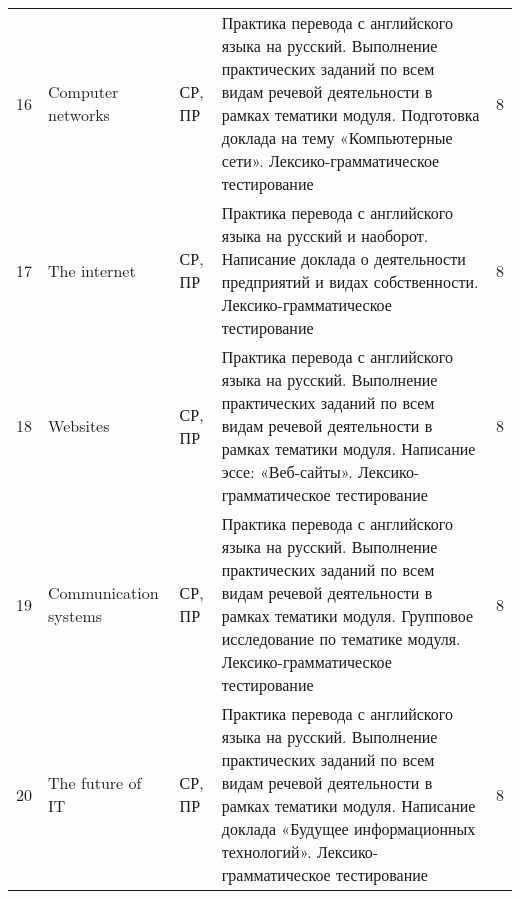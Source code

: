 \begin{center}
\begin{longtable}{p{} p{} p{} p{} p{}}
16 & Computer networks & СР, ПР & Практика перевода с английского языка на русский. Выполнение практических заданий по всем видам речевой деятельности в рамках тематики модуля. 
Подготовка доклада на тему «Компьютерные сети».  Лексико-грамматическое тестирование& 8 \\
17 & The internet & СР, ПР & Практика перевода с английского языка на русский и наоборот. Написание доклада о деятельности предприятий и видах собственности. Лексико-грамматическое тестирование & 8 \\
18 & Websites & СР, ПР & Практика перевода с английского языка на русский. Выполнение практических заданий по всем видам речевой деятельности в рамках тематики модуля. Написание эссе: «Веб-сайты». Лексико-грамматическое тестирование & 8 \\
19 & Communication systems & СР, ПР & Практика перевода с английского языка на русский. Выполнение практических заданий по всем видам речевой деятельности в рамках тематики модуля. Групповое исследование по тематике модуля. Лексико-грамматическое тестирование & 8 \\
20 & The future of IT & СР, ПР & Практика перевода с английского языка на русский. Выполнение практических заданий по всем видам речевой деятельности в рамках тематики модуля. Написание доклада «Будущее информационных технологий». Лексико-грамматическое тестирование & 8 \\
\end{longtable}
\end{center}

